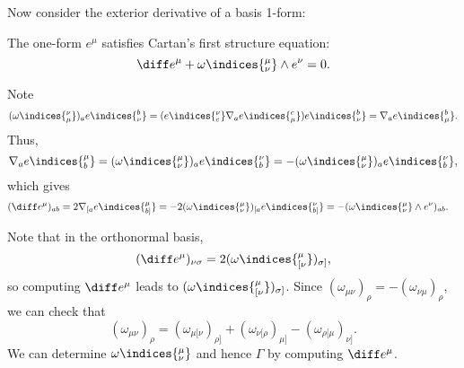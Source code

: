 \documentclass[12pt]{article}
\begin{document}
Now consider the exterior derivative of a basis 1-form:

\begin{lemma}
	The one-form $e^\mu$ satisfies Cartan's first structure equation:
	\[
	\diff e^\mu + \omega\indices{^{\mu}_{\nu}} \wedge e^\nu = 0.
	\]
\end{lemma}

\begin{proofbox}
	Note
	\begin{align*}
		(\omega\indices{^{\nu}_{\mu}})_a e\indices{^{b}_{\nu}} = (e\indices{_{c}^\nu} \nabla_a e\indices{^{c}_{\mu}}) e\indices{^{b}_{\nu}} = \nabla_a e\indices{^{b}_{\mu}}.
	\end{align*}
	Thus,
	\[
	\nabla_a e\indices{_{b}^\mu} = (\omega\indices{_{\nu}^\mu})_a e\indices{_{b}^\nu} = - (\omega\indices{^{\mu}_{\nu}})_a e\indices{_{b}^\nu},
	\]
	which gives
	\begin{align*}
		(\diff e^\mu)_{ab} &= 2 \nabla_{[a} e\indices{^{\mu}_{b]}} = -2 (\omega\indices{^{\mu}_{\nu}})_{[a} e\indices{_{b]}^\nu} = - (\omega\indices{^{\mu}_{\nu}} \wedge e^\nu)_{ab}.
	\end{align*}
\end{proofbox}

Note that in the orthonormal basis,
\[
	(\diff e^\mu)_{\nu\sigma} = 2(\omega\indices{^{\mu}_{[\nu}})_{\sigma]},
\]
so computing $\diff e^\mu$ leads to $(\omega\indices{^{\mu}_{[\nu}})_{\sigma]}$. Since $(\omega_{\mu\nu})_\rho = - (\omega_{\nu\mu})_\rho$, we can check that
\[
	(\omega_{\mu\nu})_\rho = (\omega_{\mu[\nu})_{\rho]} + (\omega_{\nu[\rho})_{\mu]} - (\omega_{\rho[\mu})_{\nu]}.
\]
We can determine $\omega\indices{^{\mu}_{\nu}}$ and hence $\Gamma$ by computing $\diff e^\mu$.
\end{document}

